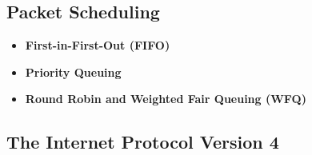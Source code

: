 \documentclass[11pt]{article}
\begin{document}
\subsection{Packet Scheduling}

\begin{itemize}
	\item \textbf{First-in-First-Out (FIFO)}
	
	\item \textbf{Priority Queuing}
	
	\item \textbf{Round Robin and Weighted Fair Queuing (WFQ)}
\end{itemize}


\subsection{The Internet Protocol Version 4}
\end{document}
